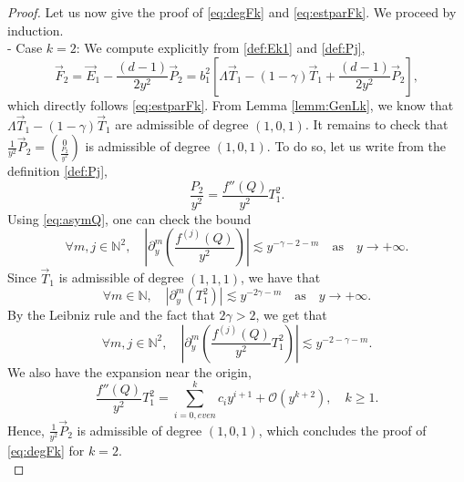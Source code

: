 \documentclass[11pt]{aims}
\theoremstyle{definition}
\numberwithin{equation}{section}
\begin{document}
\begin{proof}
Let us now give the proof of \eqref{eq:degFk} and \eqref{eq:estparFk}. We proceed by induction.\\
\noindent - Case $k = 2$: We compute explicitly from \eqref{def:Ek1} and \eqref{def:Pj},
$$\vec F_2 = \vec E_1 - \frac{(d-1)}{2y^2}\vec P_2 = b_1^2\left[\Lambda \vec T_1 - (1 - \gamma)\vec T_1 + \frac{(d-1)}{2y^2}\vec P_2\right],$$
which directly follows \eqref{eq:estparFk}. From Lemma \ref{lemm:GenLk}, we know that $\Lambda \vec T_1 - (1 - \gamma)\vec T_1$ are admissible of degree $(1,0,1)$. It remains to check that $\frac{1}{y^2}\vec P_2 = \binom{0}{\frac{P_2}{y^2}}$ is admissible of degree $(1,0,1)$. To do so, let us write from the definition \eqref{def:Pj}, 
$$\frac{P_2}{y^2} = \frac{f''(Q)}{y^2}T_1^2.$$
Using \eqref{eq:asymQ}, one can check the bound
\begin{equation}\label{eq:estfjm}
\forall m,j \in \mathbb{N}^2, \quad\left|\partial_y^m \left(\frac{f^{(j)}(Q)}{y^2}\right)\right| \lesssim y^{-\gamma - 2 - m} \quad \text{as}\quad y \to +\infty.
\end{equation}
Since $\vec T_1$ is admissible of degree $(1,1, 1)$, we have that
$$\forall m \in \mathbb{N}, \quad |\partial_y^m(T_1^2)| \lesssim y^{- 2\gamma - m}  \quad \text{as}\quad y \to +\infty.$$
By the Leibniz rule and the fact that $2\gamma > 2$, we get that
$$\forall m,j \in \mathbb{N}^2, \quad\left|\partial_y^m \left(\frac{f^{(j)}(Q)}{y^2} T_1^2\right)\right| \lesssim y^{- 2 - \gamma - m}.$$
We also have the expansion near the origin, 
$$\frac{f''(Q)}{y^2}T_1^2 = \sum_{i = 0, even}^k c_iy^{i + 1} + {\mathcal{O}}(y^{k + 2}), \quad k \geq 1.$$
Hence, $\frac{1}{y^2}\vec P_2$ is admissible of degree $(1,0,1)$, which concludes the proof of \eqref{eq:degFk} for $k = 2$.\\


\end{proof}
\end{document}
